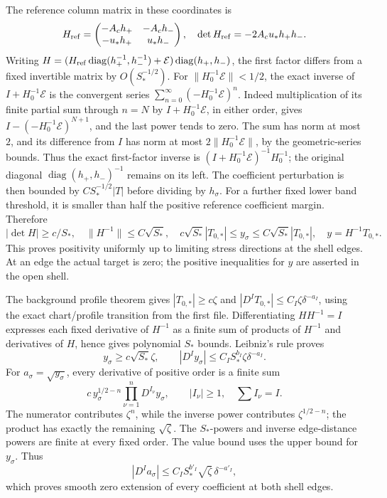 \documentclass[10pt,a4paper]{article}
\begin{document}
The reference column matrix in these coordinates is \[
H_{\rm ref}=
\begin{pmatrix}-A_ch_+&-A_ch_-\\-u_*h_+&u_*h_-\end{pmatrix},
\quad
\det H_{\rm ref}=-2A_cu_*h_+h_-.
\] Writing \(H=(H_{\rm ref}\operatorname{diag}(h_+^{-1},h_-^{-1})+
\mathcal E)\operatorname{diag}(h_+,h_-)\), the first factor differs from a fixed invertible matrix by \(O(S_*^{-1/2})\). For \(\|H_0^{-1}\mathcal E\|<1/2\), the exact inverse of
\(I+H_0^{-1}\mathcal E\) is the convergent series
\(\sum_{n=0}^{\infty}(-H_0^{-1}\mathcal E)^n\).
Indeed multiplication of its finite partial sum through \(n=N\) by
\(I+H_0^{-1}\mathcal E\), in either order, gives
\(I-(-H_0^{-1}\mathcal E)^{N+1}\), and the last power tends to zero.
The sum has norm at most \(2\), and its difference from \(I\) has norm
at most \(2\|H_0^{-1}\mathcal E\|\), by the geometric-series bounds.
Thus the exact first-factor inverse is
\((I+H_0^{-1}\mathcal E)^{-1}H_0^{-1}\); the original diagonal
\(\operatorname{diag}(h_+,h_-)^{-1}\) remains on its left. The coefficient perturbation is then bounded by \(CS_*^{-1/2}|T|\) before dividing by \(h_\sigma\). For a further fixed lower band threshold, it is smaller than half the positive reference coefficient margin. Therefore \[
|\det H|\ge c/S_*,\quad \|H^{-1}\|\le C\sqrt{S_*},\quad
c\sqrt{S_*}|T_{0,*}|\le y_\sigma\le C\sqrt{S_*}|T_{0,*}|,
\quad y=H^{-1}T_{0,*}.
\] This proves positivity uniformly up to limiting stress directions at the shell edges. At an edge the actual target is zero; the positive inequalities for \(y\) are asserted in the open shell.

The background profile theorem gives \(|T_{0,*}|\ge c\zeta\) and \(|D^IT_{0,*}|\le C_I\zeta\delta^{-a_I}\), using the exact chart/profile transition from the first file. Differentiating \(HH^{-1}=I\) expresses each fixed derivative of \(H^{-1}\) as a finite sum of products of \(H^{-1}\) and derivatives of \(H\), hence gives polynomial \(S_*\) bounds. Leibniz's rule proves \[
y_\sigma\ge c\sqrt{S_*}\zeta,\qquad
|D^Iy_\sigma|\le C_IS_*^{b_I}\zeta\delta^{-a_I}.
\] For \(a_\sigma=\sqrt{y_\sigma}\), every derivative of positive order is a finite sum \[
c\,y_\sigma^{1/2-n}\prod_{\nu=1}^nD^{I_\nu}y_\sigma,
\qquad |I_\nu|\ge1,\quad \sum I_\nu=I.
\] The numerator contributes \(\zeta^n\), while the inverse power contributes \(\zeta^{1/2-n}\); the product has exactly the remaining \(\sqrt\zeta\). The \(S_*\)-powers and inverse edge-distance powers are finite at every fixed order. The value bound uses the upper bound for \(y_\sigma\). Thus \[
|D^Ia_\sigma|\le C_IS_*^{b'_I}\sqrt\zeta\,\delta^{-a'_I},
\] which proves smooth zero extension of every coefficient at both shell edges.
\end{document}
